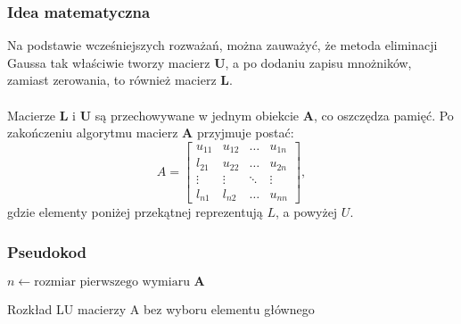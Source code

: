 \documentclass{article}
\begin{document}
\subsubsection{Idea matematyczna}
Na podstawie wcześniejszych rozważań, można zauważyć, że metoda eliminacji Gaussa tak właściwie tworzy macierz $\mathbf{U}$, a po dodaniu zapisu mnożników, zamiast zerowania, to również macierz $\mathbf{L}$. \\ \\ Macierze $\mathbf{L}$ i $\mathbf{U}$ są przechowywane w jednym obiekcie $\mathbf{A}$, co oszczędza pamięć. Po zakończeniu algorytmu macierz $\mathbf{A}$ przyjmuje postać:
\[
A = \begin{bmatrix}
    u_{11} & u_{12} & \dots & u_{1n} \\
    l_{21} & u_{22} & \dots & u_{2n} \\
    \vdots & \vdots & \ddots & \vdots \\
    l_{n1} & l_{n2} & \dots & u_{nn}
\end{bmatrix},
\]
gdzie elementy poniżej przekątnej reprezentują \( L \), a powyżej \( U \).
\subsubsection{Pseudokod}
\begin{algorithm}[H]
\SetAlgoLined
\setcounter{AlgoLine}{0} %

$n \gets \text{rozmiar pierwszego wymiaru } \mathbf{A}$\;


\;
\caption{Rozkład LU  macierzy A bez wyboru elementu głównego}
\end{algorithm}
\end{document}
